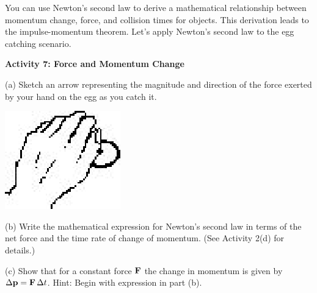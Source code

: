 You can use Newton's second law to derive a mathematical relationship between
momentum change, force, and collision times for objects. This derivation leads
to the impulse-momentum theorem. Let's apply Newton's second law to the egg
catching scenario.

\textbf{Activity 7: Force and Momentum Change }

(a) Sketch an arrow representing the magnitude and direction of the force 
exerted by your hand on the egg as you catch it.

\vspace{0.3cm}
{\par\centering \includegraphics{momentum/momentum_fig3.eps} \par}
\vspace{0.3cm}

(b) Write the mathematical expression for Newton's second law in terms of the
net force and the time rate of change of momentum. (See Activity 2(d) for 
details.)
\vspace{20mm}


(c) Show that for a constant force \( {\bf F} \) the change in momentum
is given by \( \Delta {\bf p}={\bf F}\,\Delta t\).  Hint: Begin with expression in 
part (b).

